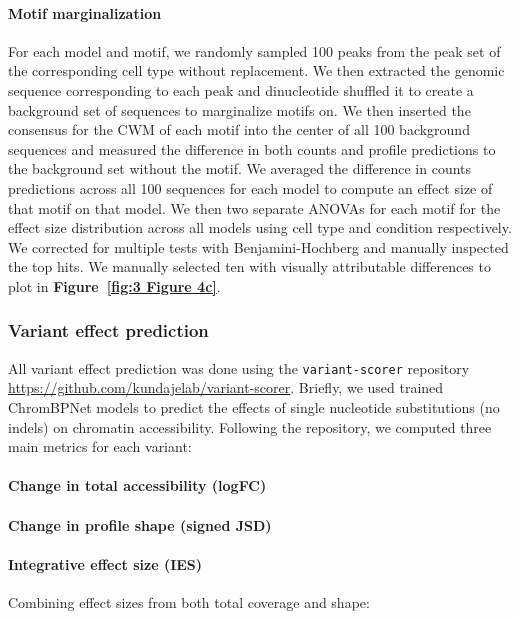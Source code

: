\paragraph{Motif marginalization}

For each model and motif, we randomly sampled 100 peaks from the peak set of the corresponding cell type without replacement. We then extracted the genomic sequence corresponding to each peak and dinucleotide shuffled it to create a background set of sequences to marginalize motifs on. We then inserted the consensus for the CWM of each motif into the center of all 100 background sequences and measured the difference in both counts and profile predictions to the background set without the motif. We averaged the difference in counts predictions across all 100 sequences for each model to compute an effect size of that motif on that model. We then two separate ANOVAs for each motif for the effect size distribution across all models using cell type and condition respectively. We corrected for multiple tests with Benjamini-Hochberg \cite{Benjamini1995-da} and manually inspected the top hits. We manually selected ten with visually attributable differences to plot in \textbf{Figure~\ref{fig:3 Figure 4c}}.

\subsubsection{Variant effect prediction}

All variant effect prediction was done using the \texttt{variant-scorer} repository \url{https://github.com/kundajelab/variant-scorer}. Briefly, we used trained ChromBPNet models to predict the effects of single nucleotide substitutions (no indels) on chromatin accessibility. Following the repository, we computed three main metrics for each variant:

\paragraph{Change in total accessibility (logFC)} 

\paragraph{Change in profile shape (signed JSD)} 

\paragraph{Integrative effect size (IES)} 
Combining effect sizes from both total coverage and shape:

